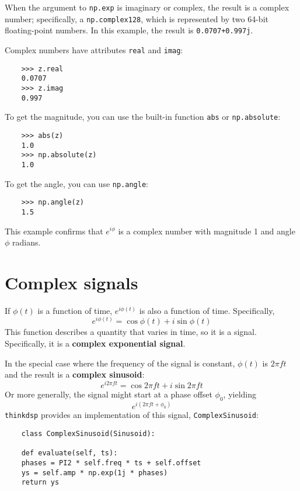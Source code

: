 When the argument to {\tt np.exp} is imaginary or complex, the
result is a complex number; specifically, a {\tt np.complex128},
which is represented by two 64-bit floating-point numbers.
In this example, the result is {\tt 0.0707+0.997j}.

Complex numbers have attributes {\tt real} and {\tt imag}:

\begin{verbatim}
	>>> z.real
	0.0707
	>>> z.imag
	0.997
\end{verbatim}

To get the magnitude, you can use the built-in function {\tt abs}
or {\tt np.absolute}:

\begin{verbatim}
	>>> abs(z)
	1.0
	>>> np.absolute(z)
	1.0
\end{verbatim}

To get the angle, you can use {\tt np.angle}:

\begin{verbatim}
	>>> np.angle(z)
	1.5
\end{verbatim}

This example confirms that $e^{i \phi}$ is a complex number with
magnitude 1 and angle $\phi$ radians.


\section{Complex signals}

If $\phi(t)$ is a function of time, $e^{i \phi(t)}$ is also a function
of time.  Specifically,
%
\[ e^{i \phi(t)} = \cos \phi(t) + i \sin \phi(t) \]
%
This function describes a quantity that varies in time, so it is
a signal.  Specifically, it is a {\bf complex exponential signal}.

In the special case where the frequency of the signal is constant,
$\phi(t)$ is $2 \pi f t$ and the result is a {\bf complex sinusoid}:
%
\[ e^{i 2 \pi f t} = \cos 2 \pi f t + i \sin 2 \pi f t \]
%
Or more generally, the signal might start at a phase offset
$\phi_0$, yielding
%
\[ e^{i (2 \pi f t + \phi_0)} \]
%
{\tt thinkdsp} provides an implementation of this signal,
{\tt ComplexSinusoid}:

\begin{verbatim}
	class ComplexSinusoid(Sinusoid):
	
	def evaluate(self, ts):
	phases = PI2 * self.freq * ts + self.offset
	ys = self.amp * np.exp(1j * phases)
	return ys
\end{verbatim}

